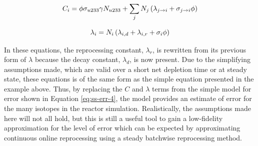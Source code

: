 \begin{equation} \hfill
C_i = \phi \sigma_{u233} \gamma N_{u233} + \sum_j N_j \left( \lambda_{j \rightarrow i }  + \sigma_{j \rightarrow i} \phi \right)
\hfill\label{eq:ss-mass-p5-update} \end{equation}

\begin{equation} \hfill
\lambda_i = N_i \left( \lambda_{i, d} + \lambda_{i, r} + \sigma_i \phi \right)
\hfill\label{eq:ss-mass-p5-steady-update} \end{equation}

In these equations, the reprocessing constant, $\lambda_r$, is rewritten from its previous form of $\lambda$ because the decay constant, $\lambda_d$, is now present.
Due to the simplifying assumptions made, which are valid over a short net depletion time or at steady state, these equations is of the same form as the simple equation presented in the example above.
Thus, by replacing the $C$ and $\lambda$ terms from the simple model for error shown in Equation \eqref{eq:ss-err-4}, the model provides an estimate of error for the many isotopes in the reactor simulation.
Realistically, the assumptions made here will not all hold, but this is still a useful tool to gain a low-fidelity approximation for the level of error which can be expected by approximating continuous online reprocessing using a steady batchwise reprocessing method.




